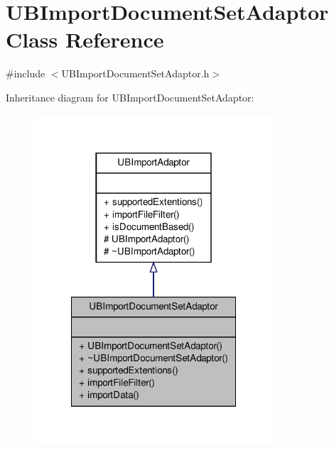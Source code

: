 \hypertarget{class_u_b_import_document_set_adaptor}{\section{U\-B\-Import\-Document\-Set\-Adaptor Class Reference}
\label{dc/d24/class_u_b_import_document_set_adaptor}
}


{\ttfamily \#include $<$U\-B\-Import\-Document\-Set\-Adaptor.\-h$>$}



Inheritance diagram for U\-B\-Import\-Document\-Set\-Adaptor\-:
\nopagebreak
\begin{figure}[H]
\begin{center}
\leavevmode
\includegraphics[width=252pt]{dc/d8f/class_u_b_import_document_set_adaptor__inherit__graph}
\end{center}
\end{figure}


